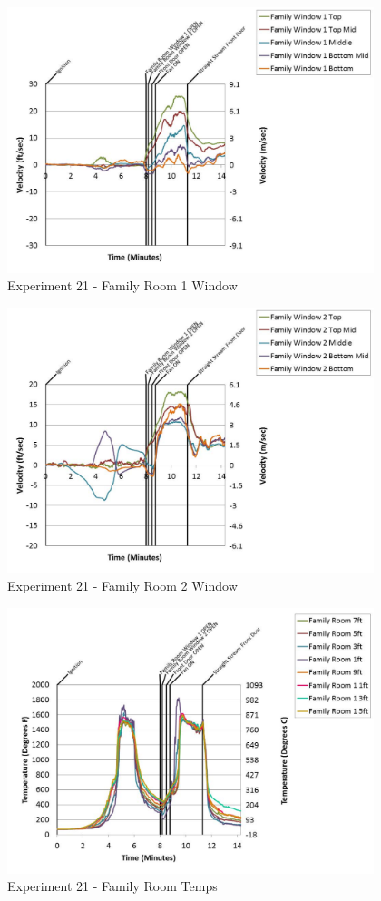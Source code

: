 \documentclass{article}
\begin{document}
\begin{appendices}
	\begin{figure}[h!]
		\centering
		\includegraphics[height=3.05in]{0_Images/Results_Charts/Exp_21_Charts/FamilyRoom1Window.pdf}
		\caption{Experiment 21 - Family Room 1 Window}
	\end{figure}
 
	\clearpage

	\begin{figure}[h!]
		\centering
		\includegraphics[height=3.05in]{0_Images/Results_Charts/Exp_21_Charts/FamilyRoom2Window.pdf}
		\caption{Experiment 21 - Family Room 2 Window}
	\end{figure}
 

	\begin{figure}[h!]
		\centering
		\includegraphics[height=3.05in]{0_Images/Results_Charts/Exp_21_Charts/FamilyRoomTemps.pdf}
		\caption{Experiment 21 - Family Room Temps}
	\end{figure}
 

\end{appendices}
\end{document}
